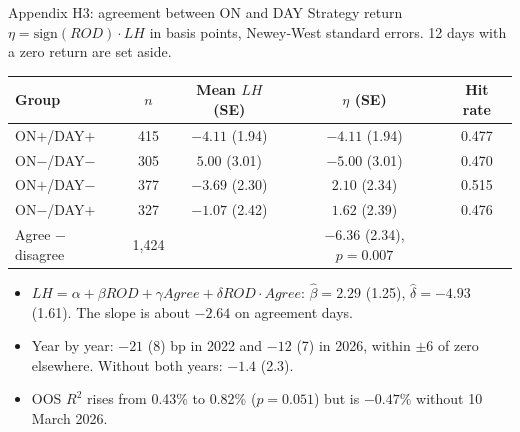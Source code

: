 \documentclass[aspectratio=169,10pt]{beamer}
\begin{document}
\begin{frame}{Appendix H3: agreement between ON and DAY}
  \small
  Strategy return $\eta=\mathrm{sign}(ROD)\cdot LH$ in basis points, Newey-West standard errors. 12 days with a zero return are set aside.
  \begin{center}
  \begin{tabular}{lcccc}
    \hline
    Group & $n$ & Mean $LH$ (SE) & $\eta$ (SE) & Hit rate\\
    \hline
    ON$+$/DAY$+$ & 415 & $-4.11$ (1.94) & $-4.11$ (1.94) & 0.477\\
    ON$-$/DAY$-$ & 305 & $5.00$ (3.01) & $-5.00$ (3.01) & 0.470\\
    ON$+$/DAY$-$ & 377 & $-3.69$ (2.30) & $2.10$ (2.34) & 0.515\\
    ON$-$/DAY$+$ & 327 & $-1.07$ (2.42) & $1.62$ (2.39) & 0.476\\
    \hline
    Agree $-$ disagree & 1,424 & & $-6.36$ (2.34), $p=0.007$ & \\
    \hline
  \end{tabular}
  \end{center}
  \begin{itemize}
    \item $LH=\alpha+\beta ROD+\gamma Agree+\delta ROD{\cdot}Agree$: $\hat\beta=2.29$ (1.25), $\hat\delta=-4.93$ (1.61). The slope is about $-2.64$ on agreement days.
    \item Year by year: $-21$ (8) bp in 2022 and $-12$ (7) in 2026, within $\pm6$ of zero elsewhere. Without both years: $-1.4$ (2.3).
    \item OOS $R^2$ rises from 0.43\% to 0.82\% ($p=0.051$) but is $-0.47\%$ without 10 March 2026.
  \end{itemize}
\end{frame}
\end{document}
